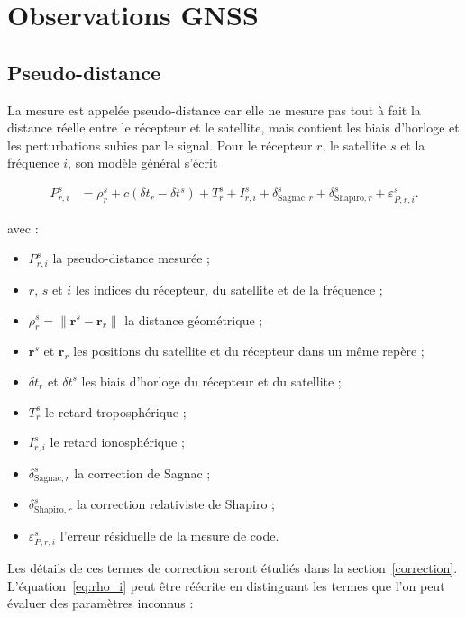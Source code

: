 \section{Observations GNSS}

\subsection{Pseudo-distance}

La mesure est appelée pseudo-distance car elle ne mesure pas tout à fait la distance réelle entre le récepteur et le satellite,
mais contient les biais d'horloge et les perturbations subies par le
signal. Pour le récepteur $r$, le satellite $s$ et la fréquence $i$, son modèle
général s'écrit~\cite[p.~591]{capderou2012}

\begin{align}
P_{r,i}^s
&=
\rho_r^s
+c\left(\delta t_r-\delta t^s\right)
+T_r^s
+I_{r,i}^s
+\delta_{\mathrm{Sagnac},r}^s
+\delta_{\mathrm{Shapiro},r}^s
+\varepsilon_{P,r,i}^s.
\label{eq:rho_i}
\end{align}

avec :

\begin{itemize}
    \item $P_{r,i}^s$ la pseudo-distance mesurée ;
    \item $r$, $s$ et $i$ les indices du récepteur, du satellite et de la
    fréquence ;
    \item $\rho_r^s=\|\mathbf r^s-\mathbf r_r\|$ la distance géométrique ;
    \item $\mathbf r^s$ et $\mathbf r_r$ les positions du satellite et du
    récepteur dans un même repère ;
    \item $\delta t_r$ et $\delta t^s$ les biais d'horloge du récepteur et du
    satellite ;
    \item $T_r^s$ le retard troposphérique ;
    \item $I_{r,i}^s$ le retard ionosphérique ;
    \item $\delta_{\mathrm{Sagnac},r}^s$ la correction de Sagnac ;
    \item $\delta_{\mathrm{Shapiro},r}^s$ la correction relativiste de
    Shapiro ;
    \item $\varepsilon_{P,r,i}^s$ l'erreur résiduelle de la mesure de code.
\end{itemize}

Les détails de ces termes de correction seront étudiés dans la
section~\ref{correction}. L'équation~\eqref{eq:rho_i} peut être réécrite en
distinguant les termes que l'on peut évaluer des paramètres inconnus :

